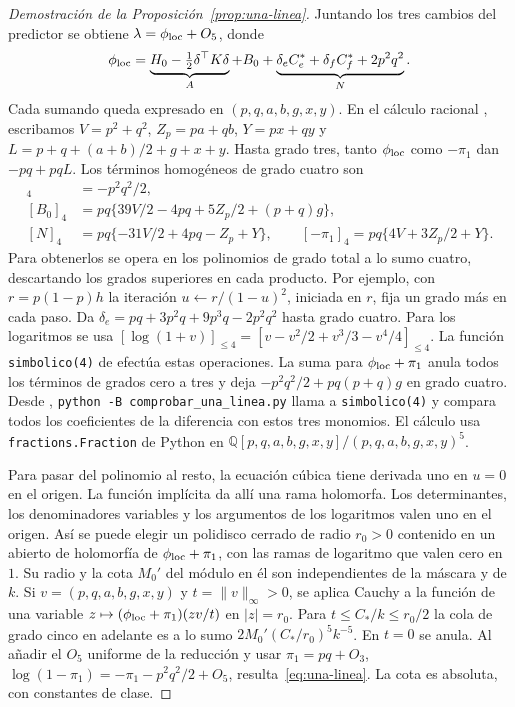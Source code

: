 \begin{proof}[Demostración de la Proposición~\ref{prop:una-linea}]
Juntando los tres cambios del predictor se obtiene $\lambda=\phi_{\mathrm{loc}}+O_5$, donde
\[
 \phi_{\mathrm{loc}}=\underbrace{H_0-\tfrac12\delta^\top K\delta}_{A}
      +B_0+\underbrace{\delta_e C_e^*+\delta_f C_f^*+2p^2q^2}_{N}.
\]
Cada sumando queda expresado en $(p,q,a,b,g,x,y)$. En el cálculo racional ,
escribamos $V=p^2+q^2$, $Z_p=pa+qb$, $Y=px+qy$ y
$L=p+q+(a+b)/2+g+x+y$. Hasta grado tres, tanto $\phi_{\mathrm{loc}}$ como $-\pi_1$
dan $-pq+pqL$. Los términos homogéneos de grado cuatro son
\begin{align*}
 [A]_4&=-p^2q^2/2,\\
 [B_0]_4&=pq\{39V/2-4pq+5Z_p/2+(p+q)g\},\\
 [N]_4&=pq\{-31V/2+4pq-Z_p+Y\},\qquad [-\pi_1]_4=pq\{4V+3Z_p/2+Y\}.
\end{align*}
Para obtenerlos se opera en los polinomios de grado total a lo sumo cuatro, descartando
los grados superiores en cada producto. Por ejemplo, con $r=p(1-p)h$ la iteración
$u\leftarrow r/(1-u)^2$, iniciada en $r$, fija un grado más en cada paso.
Da $\delta_e=pq+3p^2q+9p^3q-2p^2q^2$ hasta grado cuatro. Para los logaritmos se usa
$[\log(1+v)]_{\le4}=[v-v^2/2+v^3/3-v^4/4]_{\le4}$. La función
\texttt{simbolico(4)} de  efectúa estas operaciones.
La suma para $\phi_{\mathrm{loc}}+\pi_1$ anula todos los términos de grados cero a tres y deja
$-p^2q^2/2+pq(p+q)g$ en grado cuatro. Desde ,
\texttt{python -B comprobar\_una\_linea.py} llama a \texttt{simbolico(4)} y compara
todos los coeficientes de la diferencia con estos tres monomios. El cálculo usa
\texttt{fractions.Fraction} de Python en $\mathbb Q[p,q,a,b,g,x,y]/(p,q,a,b,g,x,y)^5$.

Para pasar del polinomio al resto, la ecuación cúbica tiene derivada uno en $u=0$
en el origen. La función implícita da allí una rama holomorfa. Los determinantes,
los denominadores variables y los argumentos de los logaritmos valen uno en el origen.
Así se puede elegir un polidisco cerrado de radio $r_0>0$ contenido en un abierto
de holomorfía de $\phi_{\mathrm{loc}}+\pi_1$, con las ramas de logaritmo que valen cero en $1$.
Su radio y la cota $M_0'$ del módulo en él son independientes de la máscara y de $k$.
Si $v=(p,q,a,b,g,x,y)$ y $t=\|v\|_\infty>0$, se aplica Cauchy a la función de una variable
$z\mapsto(\phi_{\mathrm{loc}}+\pi_1)(zv/t)$ en $|z|=r_0$. Para $t\le C_*/k\le r_0/2$
la cola de grado cinco en adelante es a lo sumo $2M_0'(C_*/r_0)^5k^{-5}$.
En $t=0$ se anula. Al añadir el $O_5$ uniforme de la reducción y usar
$\pi_1=pq+O_3$, $\log(1-\pi_1)=-\pi_1-p^2q^2/2+O_5$, resulta~\eqref{eq:una-linea}.
La cota es absoluta, con constantes de clase.
\end{proof}

